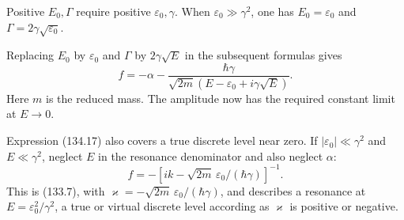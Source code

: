 Positive $E_0,\Gamma$ require positive $\varepsilon_0,\gamma$. When
$\varepsilon_0\gg\gamma^2$, one has
$E_0=\varepsilon_0$ and $\Gamma=2\gamma\sqrt{\varepsilon_0}$.

Replacing $E_0$ by $\varepsilon_0$ and $\Gamma$ by $2\gamma\sqrt E$ in the
subsequent formulas gives
\begin{equation}
 f=-\alpha-\frac{\hbar\gamma}
 {\sqrt{2m}(E-\varepsilon_0+i\gamma\sqrt E)}. \tag{134.17}
\end{equation}
Here $m$ is the reduced mass. The amplitude now has the required constant
limit at $E\to0$.

Expression (134.17) also covers a true discrete level near zero. If
$|\varepsilon_0|\ll\gamma^2$ and $E\ll\gamma^2$, neglect $E$ in the resonance
denominator and also neglect $\alpha$:
\[
 f=-[ik-\sqrt{2m}\,\varepsilon_0/(\hbar\gamma)]^{-1}.
\]
This is (133.7), with
$\varkappa=-\sqrt{2m}\,\varepsilon_0/(\hbar\gamma)$, and describes a resonance
at $E=\varepsilon_0^2/\gamma^2$, a true or virtual discrete level according as
$\varkappa$ is positive or negative.
